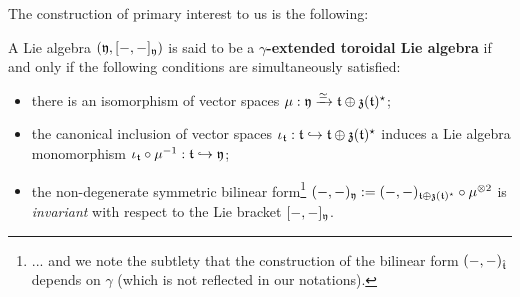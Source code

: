         The construction of primary interest to us is the following:
        \begin{definition} \label{def: yangian_extended_toroidal_lie_algebras}
            A Lie algebra $(\mathfrak{y}, [-, -]_{\mathfrak{y}})$ is said to be a \textbf{$\gamma$-extended toroidal Lie algebra} if and only if the following conditions are simultaneously satisfied:
            \begin{itemize}
                \item there is an isomorphism of vector spaces $\mu: \mathfrak{y} \xrightarrow[]{\simeq} \mathfrak{t} \oplus \mathfrak{z}(\mathfrak{t})^{\star}$;
                \item the canonical inclusion of vector spaces $\iota_{\mathfrak{t}}: \mathfrak{t} \hookrightarrow \mathfrak{t} \oplus \mathfrak{z}(\mathfrak{t})^{\star}$ induces a Lie algebra monomorphism $\iota_{\mathfrak{t}} \circ \mu^{-1}: \mathfrak{t} \hookrightarrow \mathfrak{y}$;
                \item the non-degenerate symmetric bilinear form\footnote{... and we note the subtlety that the construction of the bilinear form $(-, -)_{\hat{\mathfrak{t}}}$ depends on $\gamma$ (which is not reflected in our notations).} $(-, -)_{\fraky} := (-, -)_{\toroidal \oplus \z(\toroidal)^{\star}} \circ \mu^{\tensor 2}$ is \textit{invariant} with respect to the Lie bracket $[-, -]_{\mathfrak{y}}$.
            \end{itemize}
        \end{definition}